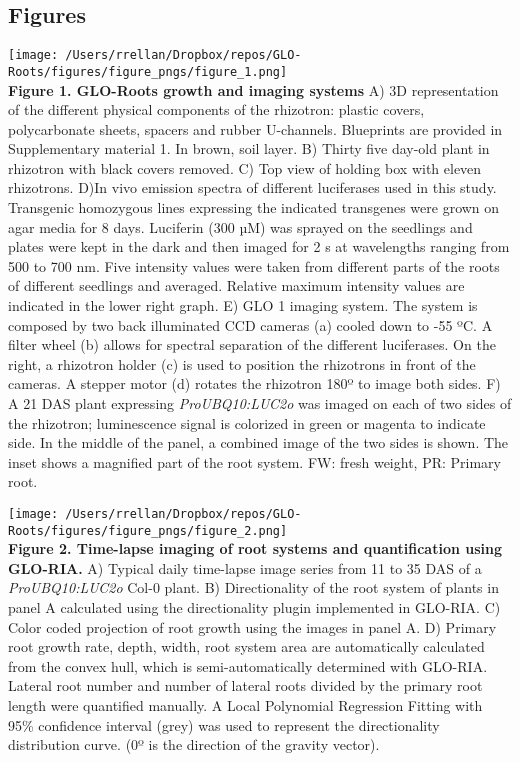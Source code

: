 \documentclass[]{article}
\begin{document}
\pagebreak

\subsection{Figures}\label{figures}

\texttt{[image: /Users/rrellan/Dropbox/repos/GLO-Roots/figures/figure\_pngs/figure\_1.png]}\\\textbf{Figure
1. GLO-Roots growth and imaging systems} A) 3D representation of the
different physical components of the rhizotron: plastic covers,
polycarbonate sheets, spacers and rubber U-channels. Blueprints are
provided in Supplementary material 1. In brown, soil layer. B) Thirty
five day-old plant in rhizotron with black covers removed. C) Top view
of holding box with eleven rhizotrons. D)In vivo emission spectra of
different luciferases used in this study. Transgenic homozygous lines
expressing the indicated transgenes were grown on agar media for 8 days.
Luciferin (300 µM) was sprayed on the seedlings and plates were kept in
the dark and then imaged for 2 s at wavelengths ranging from 500 to 700
nm. Five intensity values were taken from different parts of the roots
of different seedlings and averaged. Relative maximum intensity values
are indicated in the lower right graph. E) GLO 1 imaging system. The
system is composed by two back illuminated CCD cameras (a) cooled down
to -55 ºC. A filter wheel (b) allows for spectral separation of the
different luciferases. On the right, a rhizotron holder (c) is used to
position the rhizotrons in front of the cameras. A stepper motor (d)
rotates the rhizotron 180º to image both sides. F) A 21 DAS plant
expressing \emph{ProUBQ10:LUC2o} was imaged on each of two sides of the
rhizotron; luminescence signal is colorized in green or magenta to
indicate side. In the middle of the panel, a combined image of the two
sides is shown. The inset shows a magnified part of the root system. FW:
fresh weight, PR: Primary root.



\texttt{[image: /Users/rrellan/Dropbox/repos/GLO-Roots/figures/figure\_pngs/figure\_2.png]}\\\textbf{Figure
2. Time-lapse imaging of root systems and quantification using GLO-RIA.}
A) Typical daily time-lapse image series from 11 to 35 DAS of a
\emph{ProUBQ10:LUC2o} Col-0 plant. B) Directionality of the root system
of plants in panel A calculated using the directionality plugin
implemented in GLO-RIA. C) Color coded projection of root growth using
the images in panel A. D) Primary root growth rate, depth, width, root
system area are automatically calculated from the convex hull, which is
semi-automatically determined with GLO-RIA. Lateral root number and
number of lateral roots divided by the primary root length were
quantified manually. A Local Polynomial Regression Fitting with 95\%
confidence interval (grey) was used to represent the directionality
distribution curve. (0º is the direction of the gravity vector).
\end{document}

